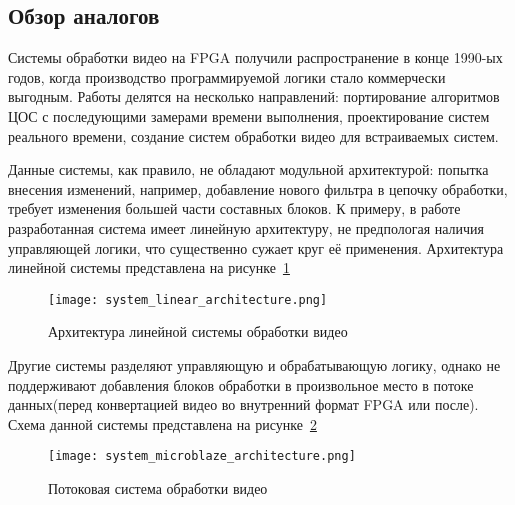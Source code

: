 \subsection{Обзор аналогов}
\label{sub:domain:alternatives}

Системы обработки видео на FPGA получили распространение в конце 1990-ых годов, когда
производство программируемой логики стало коммерчески выгодным. Работы делятся на несколько
направлений: портирование алгоритмов ЦОС с последующими замерами времени выполнения,
проектирование систем реального времени, создание систем обработки видео для встраиваемых систем.

Данные системы, как правило, не обладают модульной архитектурой: попытка внесения изменений,
например, добавление нового фильтра в цепочку обработки, требует изменения большей части
составных блоков.
К примеру, в работе \cite{meng_fpga_based_video_processing} разработанная система
имеет линейную архитектуру, не предпологая наличия управляющей логики, что существенно сужает круг
её применения. Архитектура линейной системы представлена на рисунке~\ref{fig:domain:alternatives:linear_architecture}

\begin{figure}[ht]
  \centering
  \texttt{[image: system\_linear\_architecture.png]}
  \caption{ Архитектура линейной системы обработки видео }
  \label{fig:domain:alternatives:linear_architecture}
\end{figure}

Другие системы \cite{embeded_real_time_fpga_modular} разделяют управляющую
и обрабатывающую логику, однако не поддерживают добавления блоков обработки в произвольное
место в потоке данных(перед конвертацией видео во внутренний формат FPGA или после).
Схема данной системы представлена на рисунке~\ref{fig:domain:alternatives:microblaze_architecture}

\begin{figure}[ht]
  \centering
  \texttt{[image: system\_microblaze\_architecture.png]}
  \caption{ Потоковая система обработки видео }
  \label{fig:domain:alternatives:microblaze_architecture}
\end{figure}
